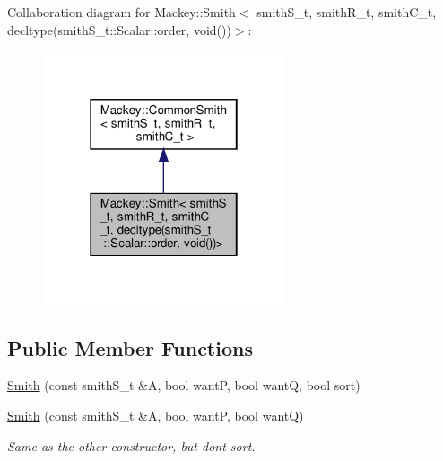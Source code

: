 Collaboration diagram for Mackey\+:\+:Smith$<$ smith\+S\+\_\+t, smith\+R\+\_\+t, smith\+C\+\_\+t, decltype(smith\+S\+\_\+t\+:\+:Scalar\+:\+:order, void())$>$\+:\nopagebreak
\begin{figure}[H]
\begin{center}
\leavevmode
\includegraphics[width=202pt]{classMackey_1_1Smith_3_01smithS__t_00_01smithR__t_00_01smithC__t_00_01decltype_07smithS__t_1_1Sc55ab905ee554e72dfb91b583ed135ddf}
\end{center}
\end{figure}
\subsection*{Public Member Functions}
\begin{DoxyCompactItemize}
\item 
\hyperlink{classMackey_1_1Smith_3_01smithS__t_00_01smithR__t_00_01smithC__t_00_01decltype_07smithS__t_1_1Scf0454e895315bf0e7b9625b582000795_a7acceb67cb7bcec7cf401450d29bc13c}{Smith} (const smith\+S\+\_\+t \&A, bool wantP, bool wantQ, bool sort)
\item 
\hyperlink{classMackey_1_1Smith_3_01smithS__t_00_01smithR__t_00_01smithC__t_00_01decltype_07smithS__t_1_1Scf0454e895315bf0e7b9625b582000795_afac9c25ee6d198ea2b510ef686dbf4fd}{Smith} (const smith\+S\+\_\+t \&A, bool wantP, bool wantQ)
\begin{DoxyCompactList}\small\item\em Same as the other constructor, but don\textquotesingle{}t sort. \end{DoxyCompactList}\end{DoxyCompactItemize}


